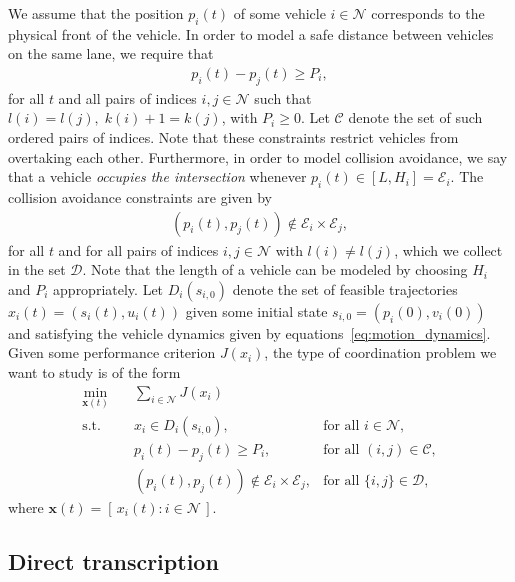 \documentclass[a4paper]{article}
\theoremstyle{definition}
\theoremstyle{plain}
\begin{document}
We assume that the position $p_{i}(t)$ of some vehicle $i \in \mathcal{N}$
corresponds to the physical front of the vehicle.
%
In order to model a safe distance between vehicles on the same lane, we require
that
\begin{align*}
  p_{i}(t) - p_{j}(t) \geq P_{i} ,
\end{align*}
for all $t$ and all pairs of indices $i, j \in \mathcal{N}$ such that
$l(i) = l(j), \; k(i) + 1 = k(j)$, with $P_{i} \geq 0$. Let $\mathcal{C}$ denote
the set of such ordered pairs of indices. Note that these constraints restrict
vehicles from overtaking each other.
%
Furthermore, in order to model collision avoidance, we say that a vehicle \textit{occupies the intersection}
whenever $p_{i}(t) \in [L, H_{i}] = \mathcal{E}_{i}$. The collision avoidance constraints are
given by
\begin{align*}
  (p_{i}(t), p_{j}(t)) \notin \mathcal{E}_{i} \times \mathcal{E}_{j},
\end{align*}
for all $t$ and for all pairs of indices $i, j \in \mathcal{N}$ with
$l(i) \neq l(j)$, which we collect in the set $\mathcal{D}$. Note that the length
of a vehicle can be modeled by choosing $H_{i}$ and $P_{i}$ appropriately.
%
Let $D_{i}(s_{i,0})$ denote the set of feasible trajectories
$x_{i}(t) = (s_{i}(t), u_{i}(t))$ given some initial state
$s_{i,0} = (p_{i}(0), v_{i}(0))$ and satisfying the vehicle dynamics given by
equations~\eqref{eq:motion_dynamics}. Given some performance criterion
$J(x_{i})$, the type of coordination problem we want to study is of the form
\begin{subequations}\label{eq:full_problem}
\begin{align}
  \min_{\mathbf{x}(t)} \quad & \sum_{i \in \mathcal{N}} J(x_{i}) \\
  \text{s.t.} \quad  & x_{i} \in D_{i}(s_{i,0}) , &\text{for all } i \in \mathcal{N} , \\
                & p_{i}(t) - p_{j}(t) \geq P_{i}, &\text{for all } (i,j) \in \mathcal{C} , \label{eq:follow_constraints} \\
                & (p_{i}(t), p_{j}(t))  \notin \mathcal{E}_{i} \times \mathcal{E}_{j} , &\text{for all } \{i,j\} \in \mathcal{D} \label{eq:collision_constraints} ,
\end{align}
\end{subequations}
where $\mathbf{x}(t) = [\, x_{i}(t) : i \in \mathcal{N} \,]$.

\subsection*{Direct transcription}
\end{document}
